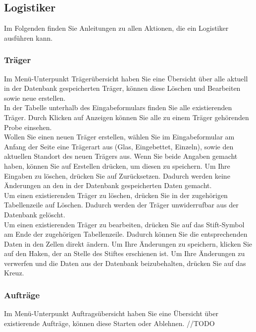 \documentclass[enabledeprecatedfontcommands,fontsize=12pt,paper=a4,twoside]{scrartcl}
\begin{document}
\subsection{Logistiker}

Im Folgenden finden Sie Anleitungen zu allen Aktionen, die ein Logistiker ausführen kann. \\

\subsubsection{Träger}
Im Menü-Unterpunkt Trägerübersicht haben Sie eine Übersicht über alle aktuell in der Datenbank gespeicherten Träger, können diese Löschen und Bearbeiten sowie neue erstellen. \\

In der Tabelle unterhalb des Eingabeformulars finden Sie alle existierenden Träger. Durch Klicken auf Anzeigen können Sie alle zu einem Träger gehörenden Probe einsehen. \\

Wollen Sie einen neuen Träger erstellen, wählen Sie im Eingabeformular am Anfang der Seite eine Trägerart aus (Glas, Eingebettet, Einzeln), sowie den aktuellen Standort des neuen Trägers aus. Wenn Sie beide Angaben gemacht haben, können Sie auf Erstellen drücken, um diesen zu speichern. Um Ihre Eingaben zu löschen, drücken Sie auf Zurücksetzen. Dadurch werden keine Änderungen an den in der Datenbank gespeicherten Daten gemacht. \\

Um einen existierenden Träger zu löschen, drücken Sie in der zugehörigen Tabellenzeile auf Löschen. Dadurch werden der Träger unwiderrufbar aus der Datenbank gelöscht. \\

Um einen existierenden Träger zu bearbeiten, drücken Sie auf das Stift-Symbol am Ende der zugehörigen Tabellenzeile. Dadurch können Sie die entsprechenden Daten in den Zellen direkt ändern. Um Ihre Änderungen zu speichern, klicken Sie auf den Haken, der an Stelle des Stiftes erschienen ist. Um Ihre Änderungen zu verwerfen und die Daten aus der Datenbank beizubehalten, drücken Sie auf das Kreuz. \\

\subsubsection{Aufträge}
Im Menü-Unterpunkt Auftragsübersicht haben Sie eine Übersicht über existierende Aufträge, können diese Starten oder Ablehnen. //TODO\\
\end{document}
